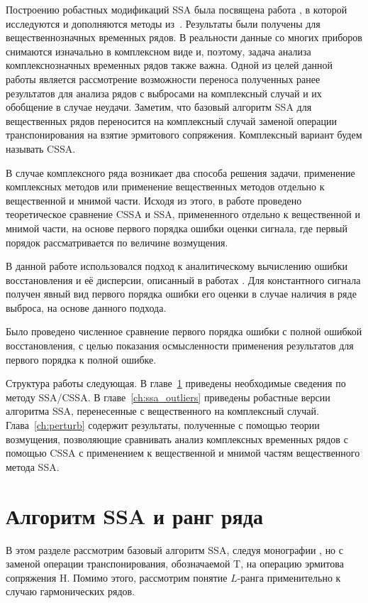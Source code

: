 \documentclass[specialist,
               substylefile = spbu.rtx,
               subf,href,colorlinks=true, 12pt]{disser}
\begin{document}
Построению робастных модификаций SSA была посвящена работа \cite{Tretyakova20}, в которой исследуются и дополняются методы из~\cite{Trickett.etal2012,Kalantari.etal2016}. Результаты были получены для вещественнозначных временных рядов. В реальности данные со многих приборов снимаются изначально в комплексном виде и, поэтому, задача анализа комплекснозначных временных рядов также важна. Одной из целей данной работы является рассмотрение возможности переноса полученных ранее результатов для анализа рядов с выбросами на комплексный случай и их обобщение в случае неудачи. Заметим, что базовый алгоритм SSA для вещественных рядов переносится на комплексный случай заменой операции транспонирования на взятие эрмитового сопряжения. Комплексный вариант будем называть CSSA.

В случае комплексного ряда возникает два способа решения задачи, применение комплексных методов или применение вещественных методов отдельно к вещественной и мнимой части. Исходя из этого, в работе проведено теоретическое сравнение CSSA и SSA, примененного отдельно к вещественной и мнимой части, на основе первого порядка ошибки оценки сигнала, где первый порядок рассматривается по величине возмущения.

В данной работе использовался подход к аналитическому вычислению ошибки восстановления и её дисперсии, описанный в работах \cite{Nekr2008,Vlas2008}. Для константного сигнала получен явный вид первого порядка ошибки его оценки в случае наличия в ряде выброса, на основе данного подхода.

Было проведено численное сравнение первого порядка ошибки с полной ошибкой восстановления, с целью показания осмысленности применения результатов для первого порядка к полной ошибке.

Структура работы следующая. В главе~\ref{ch:ssa} приведены необходимые сведения по методу SSA/CSSA. В главе~\ref{ch:ssa_outliers} приведены робастные версии алгоритма SSA, перенесенные с вещественного на комплексный случай. Глава~\ref{ch:perturb} содержит результаты, полученные с помощью теории возмущения, позволяющие сравнивать анализ комплексных временных рядов с помощью CSSA с применением к вещественной и мнимой частям  вещественного метода SSA.

\chapter{Алгоритм SSA и ранг ряда}
\label{ch:ssa}
В этом разделе рассмотрим базовый алгоритм SSA, следуя монографии \cite{Golyandina.etal2001}, но с заменой операции транспонирования, обозначаемой $\mathrm{T}$, на операцию эрмитова сопряжения $\mathrm{H}$. Помимо этого, рассмотрим понятие $L$-ранга применительно к случаю гармонических рядов.
\end{document}
